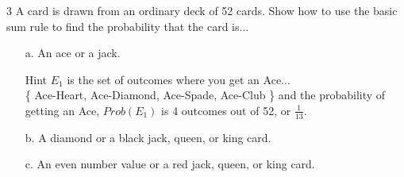 \documentclass[a4paper,12pt]{book}
\newcounter{question}
\begin{document}
        \begin{question}{\thequestion}{3}
            A card is drawn from an ordinary deck of 52 cards. Show how
            to use the basic sum rule to find the probability that
            the card is...

            \begin{itemize}
                \item[a.] An ace or a jack.
                    \begin{hint}{Hint}
                        $E_{1}$ is the set of outcomes where you get an Ace... \\
                        \{ Ace-Heart, Ace-Diamond, Ace-Spade, Ace-Club \}
                        and the probability of getting an Ace, $Prob(E_{1})$
                        is 4 outcomes out of 52, or $\frac{1}{13}$.
                    \end{hint}

                \item[b.] A diamond or a black jack, queen, or king card. ~\\

                \item[c.] An even number value or a red jack, queen, or king card. ~\\
            \end{itemize}
        \end{question}
\end{document}
